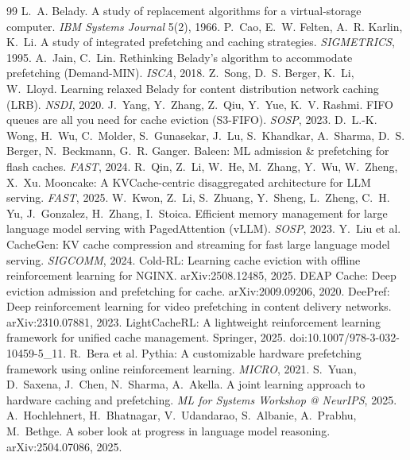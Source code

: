 \documentclass[11pt]{article}
\begin{document}
\begin{thebibliography}{99}\footnotesize
{} L.~A. Belady. A study of replacement algorithms for a virtual-storage computer. \emph{IBM Systems Journal} 5(2), 1966.
 P.~Cao, E.~W. Felten, A.~R. Karlin, K.~Li. A study of integrated prefetching and caching strategies. \emph{SIGMETRICS}, 1995.
 A.~Jain, C.~Lin. Rethinking Belady's algorithm to accommodate prefetching (Demand-MIN). \emph{ISCA}, 2018.
 Z.~Song, D.~S. Berger, K.~Li, W.~Lloyd. Learning relaxed Belady for content distribution network caching (LRB). \emph{NSDI}, 2020.
 J.~Yang, Y.~Zhang, Z.~Qiu, Y.~Yue, K.~V. Rashmi. FIFO queues are all you need for cache eviction (S3-FIFO). \emph{SOSP}, 2023.
 D.~L.-K. Wong, H.~Wu, C.~Molder, S.~Gunasekar, J.~Lu, S.~Khandkar, A.~Sharma, D.~S. Berger, N.~Beckmann, G.~R. Ganger. Baleen: ML admission \& prefetching for flash caches. \emph{FAST}, 2024.
 R.~Qin, Z.~Li, W.~He, M.~Zhang, Y.~Wu, W.~Zheng, X.~Xu. Mooncake: A KVCache-centric disaggregated architecture for LLM serving. \emph{FAST}, 2025.
 W.~Kwon, Z.~Li, S.~Zhuang, Y.~Sheng, L.~Zheng, C.~H. Yu, J.~Gonzalez, H.~Zhang, I.~Stoica. Efficient memory management for large language model serving with PagedAttention (vLLM). \emph{SOSP}, 2023.
 Y.~Liu et al. CacheGen: KV cache compression and streaming for fast large language model serving. \emph{SIGCOMM}, 2024.
 Cold-RL: Learning cache eviction with offline reinforcement learning for NGINX. arXiv:2508.12485, 2025.
 DEAP Cache: Deep eviction admission and prefetching for cache. arXiv:2009.09206, 2020.
 DeePref: Deep reinforcement learning for video prefetching in content delivery networks. arXiv:2310.07881, 2023.
 LightCacheRL: A lightweight reinforcement learning framework for unified cache management. Springer, 2025. doi:10.1007/978-3-032-10459-5\_11.
 R.~Bera et al. Pythia: A customizable hardware prefetching framework using online reinforcement learning. \emph{MICRO}, 2021.
 S.~Yuan, D.~Saxena, J.~Chen, N.~Sharma, A.~Akella. A joint learning approach to hardware caching and prefetching. \emph{ML for Systems Workshop @ NeurIPS}, 2025.
 A.~Hochlehnert, H.~Bhatnagar, V.~Udandarao, S.~Albanie, A.~Prabhu, M.~Bethge. A sober look at progress in language model reasoning. arXiv:2504.07086, 2025.
\end{thebibliography}
\end{document}
